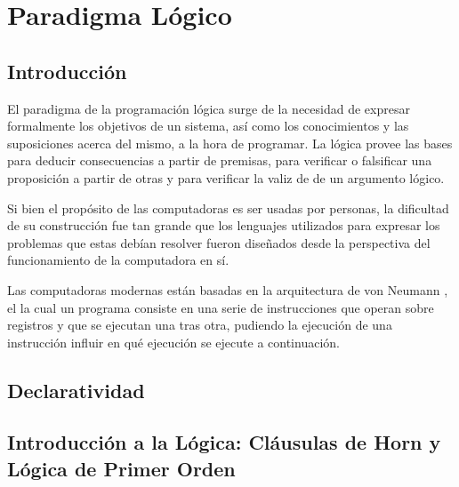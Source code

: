\documentclass[12pt,titlepage]{article}
\begin{document}

\setcounter{page}{1}

\tableofcontents
\newpage



\clearpage	



\section{Paradigma Lógico}
\subsection{Introducción}

El paradigma de la programación lógica surge de la necesidad de expresar formalmente los objetivos de un sistema, así como los conocimientos y las suposiciones acerca del mismo, a la hora de programar. La lógica provee las bases para deducir consecuencias a partir de premisas, para verificar o falsificar una proposición a partir de otras y para verificar la valiz de de un argumento lógico.

Si bien el propósito de las computadoras es ser usadas por personas, la dificultad de su construcción fue tan grande que los lenguajes utilizados para expresar los problemas que estas debían resolver fueron diseñados desde la perspectiva del funcionamiento de la computadora en sí.

Las computadoras modernas están basadas en la arquitectura de von Neumann \cite{vonneumann}, el la cual un programa consiste en una serie de instrucciones que operan sobre registros y que se ejecutan una tras otra, pudiendo la ejecución de una instrucción influir en qué ejecución se ejecute a continuación.



\subsection{Declaratividad}
\subsection{Introducción a la Lógica: Cláusulas de Horn y Lógica de Primer Orden}
\end{document}
